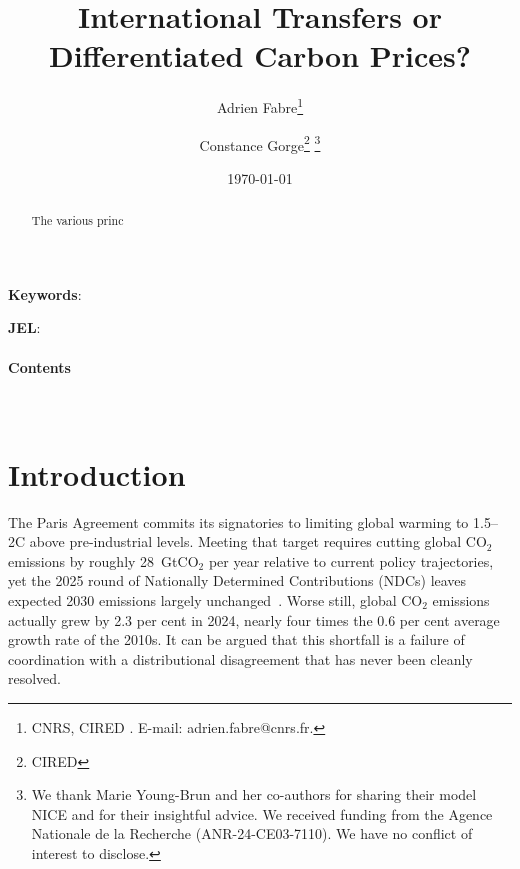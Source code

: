 \documentclass[12pt,english]{article}
\title{International Transfers or Differentiated Carbon Prices?
} %
\author{Adrien Fabre\footnote{CNRS, CIRED%
. E-mail: adrien.fabre@cnrs.fr.} \and Constance Gorge\footnote{CIRED}
\footnote{We %
thank Marie Young-Brun and her co-authors for sharing their model NICE and for their insightful advice. 
We received funding from the Agence Nationale de la Recherche (ANR-24-CE03-7110). We have no conflict of interest to disclose.}
}  %
\date{\today} %
\makeatletter
\renewcommand\tableofcontents{%
    \@starttoc{toc}%
}
\newcommand{\bo}[1]{\textbf{#1}}
\makeatother
\begin{document}
\sloppy
\maketitle

\vspace{-1cm}  %
\begin{center}
\end{center}


\begin{abstract} %
The various princ

\end{abstract}

\textbf{Keywords}: %

\textbf{JEL}: %


\paragraph{Contents} \quad \\  %

\tableofcontents


\clearpage



\section{Introduction}

The Paris Agreement commits its signatories to limiting global warming to 1.5--2\textdegree C above pre-industrial levels. Meeting that target requires cutting global CO$_2$ emissions by roughly 28~GtCO$_2$ per year relative to current policy trajectories, yet the 2025 round of Nationally Determined Contributions (NDCs) leaves expected 2030 emissions largely unchanged~\citep{unepgap2025}. Worse still, global CO$_2$ emissions actually grew by 2.3 per cent in 2024, nearly four times the 0.6 per cent average growth rate of the 2010s. It can be argued that this shortfall is a failure of coordination with a distributional disagreement that has never been cleanly resolved.
\end{document}
